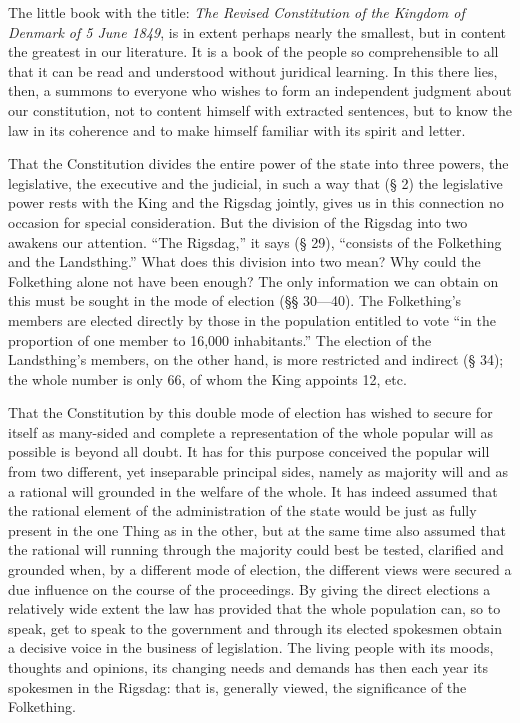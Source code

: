 \documentclass[12pt,a4paper,openany]{book}
\newcommand{\opage}[1]{\marginnote{\footnotesize\textit{[#1]}}}
\begin{document}
The little book with the title: \emph{The Revised
Constitution of the Kingdom of Denmark of 5 June 1849},
is in extent perhaps nearly the smallest, but in
content the greatest in our literature. It is a book of the people
so comprehensible to all that it can be read and understood
without juridical learning. In this there lies, then, a summons
to everyone who wishes to form an independent judgment
about our constitution, not to content himself with extracted
sentences, but to know the law in its coherence
and to make himself familiar with its spirit and letter.

That the Constitution divides the entire power of the state into three
powers, the legislative, the executive and the
\setcounter{footnote}{0}%
\opage{6}judicial, in such a way that (§ 2) the legislative power rests with
the King and the Rigsdag jointly, gives us in this
connection no occasion for special consideration.
But the division of the Rigsdag into two awakens our attention.
``The Rigsdag,'' it says (§ 29), ``consists of the Folkething
and the Landsthing.'' What does this division into two mean?
Why could the Folkething alone not have been
enough? The only information we can
obtain on this must be sought in the mode of election (§§ 30---40). The Folkething's
members are elected directly by those in the population
entitled to vote ``in the proportion of one member
to 16,000 inhabitants.'' The election of the Landsthing's
members, on the other hand, is more restricted and indirect
(§ 34); the whole number is only 66, of whom
the King appoints 12, etc.

That the Constitution by this double mode of election
has wished to secure for itself as many-sided and complete a
representation of the whole popular will as possible is
beyond all doubt. It has for this purpose conceived
the popular will from two different, yet inseparable
principal sides, namely as majority will and as a rational will
grounded in the welfare of the whole. It has indeed
assumed that the rational element of the administration of the state would be just as
fully present in the one Thing as in the
other, but at the same time also assumed that the rational will running through
the majority could best be
tested, clarified and grounded when, by a different
mode of election, the different views were secured
a due influence on the course of
the proceedings. By giving the direct elections a relatively
wide extent the law has provided that the whole population
can, so to speak, get to speak to the government and
\setcounter{footnote}{0}%
\opage{7}through its elected spokesmen obtain a decisive
voice in the business of legislation. The living people
with its moods, thoughts and opinions, its changing
needs and demands has then each year its
spokesmen in the Rigsdag: that is, generally viewed,
the significance of the Folkething.
\end{document}
